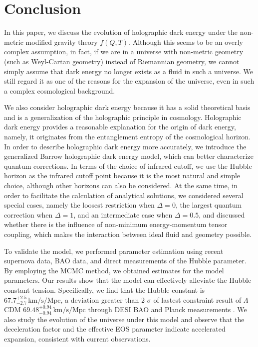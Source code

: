 \documentclass[a4paper,fleqn]{cas-sc}
\begin{document}
\section{Conclusion}\label{sec:conclusion}

In this paper, we discuss the evolution of holographic dark energy under the non-metric modified gravity theory $f(Q,T)$. Although this seems to be an overly complex assumption, in fact, if we are in a universe with non-metric geometry (such as Weyl-Cartan geometry) instead of Riemannian geometry, we cannot simply assume that dark energy no longer exists as a fluid in such a universe. We still regard it as one of the reasons for the expansion of the universe, even in such a complex cosmological background.

We also consider holographic dark energy because it has a solid theoretical basis and is a generalization of the holographic principle in cosmology. Holographic dark energy provides a reasonable explanation for the origin of dark energy, namely, it originates from the entanglement entropy of the cosmological horizon. In order to describe holographic dark energy more accurately, we introduce the generalized Barrow holographic dark energy model, which can better characterize quantum corrections. In terms of the choice of infrared cutoff, we use the Hubble horizon as the infrared cutoff point because it is the most natural and simple choice, although other horizons can also be considered. At the same time, in order to facilitate the calculation of analytical solutions, we considered several special cases, namely the loosest restriction when $\Delta=0$, the largest quantum correction when $\Delta=1$, and an intermediate case when $\Delta=0.5$, and discussed whether there is the influence of non-minimum energy-momentum tensor coupling, which makes the interaction between ideal fluid and geometry possible.

To validate the model, we performed parameter estimation using recent supernova data, BAO data, and direct measurements of the Hubble parameter. By employing the MCMC method, we obtained estimates for the model parameters. Our results show that the model can effectively alleviate the Hubble constant tension. Specifically, we find that the Hubble constant is $67.7^{+2.5}_{-2.7}\, \text{km/s/Mpc}$, a deviation greater than 2 $\sigma$ of lastest constraint result of $\Lambda$CDM $69.48^{+0.94}_{-0.94}\, \text{km/s/Mpc}$ through DESI BAO and Planck measurements \cite{pogosian2024consistencytestcosmologicalmodel}. We also study the evolution of the universe under this model and observe that the deceleration factor and the effective EOS parameter indicate accelerated expansion, consistent with current observations.
\end{document}
